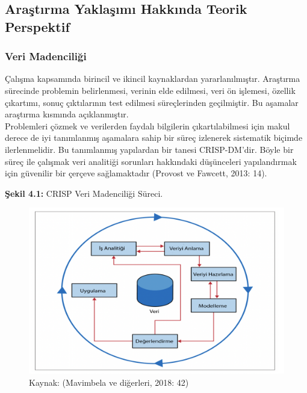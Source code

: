 \documentclass[
]{book}
\begin{document}
\hypertarget{araux15ftux131rma-yaklaux15fux131mux131-hakkux131nda-teorik-perspektif}{%
\subsection{Araştırma Yaklaşımı Hakkında Teorik Perspektif}\label{araux15ftux131rma-yaklaux15fux131mux131-hakkux131nda-teorik-perspektif}}

\hypertarget{veri-madenciliux11fi}{%
\subsubsection{Veri Madenciliği}\label{veri-madenciliux11fi}}

Çalışma kapsamında birincil ve ikincil kaynaklardan yararlanılmıştır. Araştırma sürecinde problemin belirlenmesi, verinin elde edilmesi, veri ön işlemesi, özellik çıkartımı, sonuç çıktılarının test edilmesi süreçlerinden geçilmiştir. Bu aşamalar araştırma kısmında açıklanmıştır.\\
Problemleri çözmek ve verilerden faydalı bilgilerin çıkartılabilmesi için makul derece de iyi tanımlanmış aşamalara sahip bir süreç izlenerek sistematik biçimde ilerlenmelidir. Bu tanımlanmış yapılardan bir tanesi CRISP-DM'dir. Böyle bir süreç ile çalışmak veri analitiği sorunları hakkındaki düşünceleri yapılandırmak için güvenilir bir çerçeve sağlamaktadır (Provost ve Fawcett, 2013: 14).

\textbf{Şekil 4.1:} CRISP Veri Madenciliği Süreci.

\begin{figure}
\includegraphics[width=0.95\linewidth,height=0.95\textheight]{tablolar-sekiller/sekil-4-1} \caption{Kaynak: (Mavimbela ve diğerleri, 2018: 42)}\label{fig:unnamed-chunk-1}
\end{figure}
\end{document}
